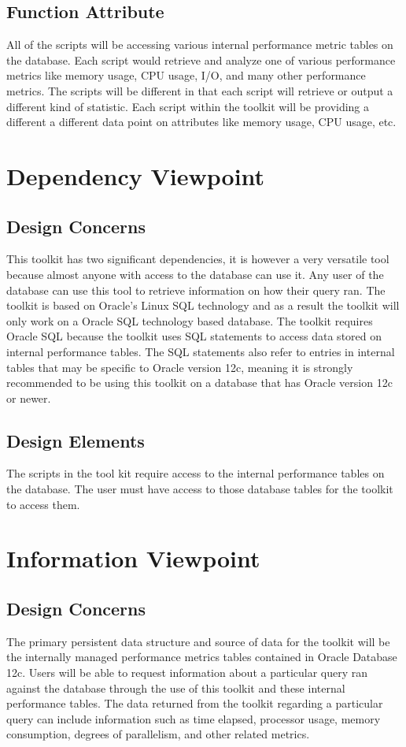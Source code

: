 \documentclass[draftclsnofoot, onecolumn, compsoc, 10pt]{IEEEtran}
\begin{document}
\subsection{Function Attribute}
All of the scripts will be accessing various internal performance metric tables on the database. Each script would retrieve and analyze one of various performance metrics like memory usage, CPU usage, I/O, and many other performance metrics.
The scripts will be different in that each script will retrieve or output a different kind of statistic.
Each script within the toolkit will be providing a different a different data point on attributes like memory usage, CPU usage, etc.

\section{Dependency Viewpoint}
\subsection{Design Concerns}
This toolkit has two significant dependencies, it is however a very versatile tool because almost anyone with access to the database can use it.
Any user of the database can use this tool to retrieve information on how their query ran.
The toolkit is based on Oracle's Linux SQL technology and as a result the toolkit will only work on a Oracle SQL technology based database.
The toolkit requires Oracle SQL because the toolkit uses SQL statements to access data stored on internal performance tables.
The SQL statements also refer to entries in internal tables that may be specific to Oracle version 12c, meaning it is strongly recommended to be using this toolkit on a database that has Oracle version 12c or newer. 

\subsection{Design Elements}
The scripts in the tool kit require access to the internal performance tables on the database. 
The user must have access to those database tables for the toolkit to access them. 


\section{Information Viewpoint}
\subsection{Design Concerns}
The primary persistent data structure and source of data for the toolkit will be the internally managed performance metrics tables contained in Oracle Database 12c.
Users will be able to request information about a particular query ran against the database through the use of this toolkit and these internal performance tables.
The data returned from the toolkit regarding a particular query can include information such as time elapsed, processor usage, memory consumption, degrees of parallelism, and other related metrics.
\end{document}
